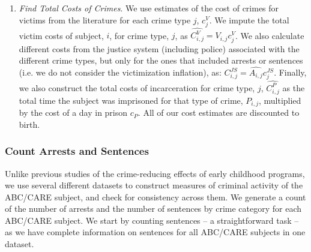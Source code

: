 \begin{enumerate}
\item \textit{Find Total Costs of Crimes}. We use estimates of the cost of crimes for victims from the literature for each crime type $j$, $c_j^V$. We impute the total victim costs of subject, $i$, for crime type, $j$, as $\widehat{C_{i,j}^V}=\widehat{V_{i,j}} c_j^V$. We also calculate different costs from the justice system (including police) associated with the different crime types, but only for the ones that included arrests or sentences (i.e. we do not consider the victimization inflation), as: $C_{i,j}^{JS}=\widehat{A_{i,j}} c_j^{JS}$. Finally, we also construct the total costs of incarceration for crime type, $j$, $\widehat{C_{i,j}^{P}}$ as the total time the subject was imprisoned for that type of crime, $P_{i,j}$, multiplied by the cost of a day in prison $c_P$. All of our cost estimates are discounted to birth.
\end{enumerate}


\subsubsection{Count Arrests and Sentences}
\noindent Unlike previous studies of the crime-reducing effects of early childhood programs, we use several different datasets to construct measures of criminal activity of the ABC/CARE subject, and check for consistency across them. We generate a count of the number of arrests and the number of sentences by crime category for each ABC/CARE subject. We start by counting sentences -- a straightforward task -- as we have complete information on sentences for all ABC/CARE subjects in one dataset.

